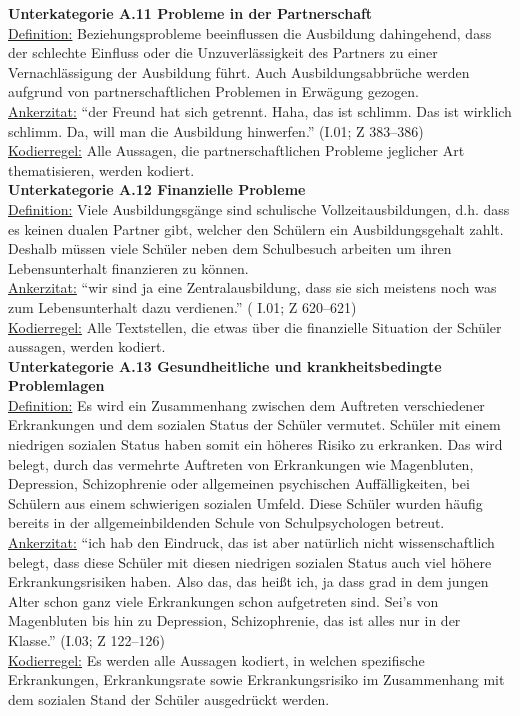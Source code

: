 \noindent
\textbf{Unterkategorie A.11 Probleme in der Partnerschaft}\\
\underline{Definition:} Beziehungsprobleme beeinflussen die Ausbildung dahingehend, dass der schlechte Einfluss oder die Unzuverlässigkeit des Partners zu einer Vernachlässigung der Ausbildung führt. Auch Ausbildungsabbrüche werden aufgrund von partnerschaftlichen Problemen in Erwägung gezogen.\\
\underline{Ankerzitat:} "`der Freund hat sich getrennt. Haha, das ist schlimm. Das ist wirklich schlimm. Da, will man die Ausbildung hinwerfen."' (I.01; Z 383--386)\\
\underline{Kodierregel:} Alle Aussagen, die partnerschaftlichen Probleme jeglicher Art thematisieren, werden kodiert.\\

\noindent
\textbf{Unterkategorie A.12 Finanzielle Probleme}\\
\underline{Definition:} Viele Ausbildungsgänge sind schulische Vollzeitausbildungen, d.h. dass es keinen dualen Partner gibt, welcher den Schülern ein Ausbildungsgehalt zahlt. Deshalb müssen viele Schüler neben dem Schulbesuch arbeiten um ihren Lebensunterhalt finanzieren zu können.\\
\underline{Ankerzitat:} "`wir sind ja eine Zentralausbildung, dass sie sich meistens noch was zum Lebensunterhalt dazu verdienen."' ( I.01; Z 620--621)\\
\underline{Kodierregel:} Alle Textstellen, die etwas über die finanzielle Situation der Schüler aussagen, werden kodiert.\\

\noindent
\textbf{Unterkategorie A.13 Gesundheitliche und krankheitsbedingte Problemlagen}\\
\underline{Definition:} Es wird ein Zusammenhang zwischen dem Auftreten verschiedener Erkrankungen und dem sozialen Status der Schüler vermutet. Schüler mit einem niedrigen sozialen Status haben somit ein höheres Risiko zu erkranken. Das wird belegt, durch das vermehrte Auftreten von Erkrankungen wie Magenbluten, Depression, Schizophrenie oder allgemeinen psychischen Auffälligkeiten, bei Schülern aus einem schwierigen sozialen Umfeld. Diese Schüler wurden häufig bereits in der allgemeinbildenden Schule von Schulpsychologen betreut.\\
\underline{Ankerzitat:} "`ich hab den Eindruck, das ist aber natürlich nicht wissenschaftlich belegt, dass diese Schüler mit diesen niedrigen sozialen Status auch viel höhere Erkrankungsrisiken haben. Also das, das heißt ich, ja dass grad in dem jungen Alter schon ganz viele Erkrankungen schon aufgetreten sind. Sei's von Magenbluten bis hin zu Depression, Schizophrenie, das ist alles nur in der Klasse."' (I.03; Z 122--126)\\
\underline{Kodierregel:} Es werden alle Aussagen kodiert, in welchen spezifische Erkrankungen, Erkrankungsrate sowie Erkrankungsrisiko im Zusammenhang mit dem sozialen Stand der Schüler ausgedrückt werden.\\

